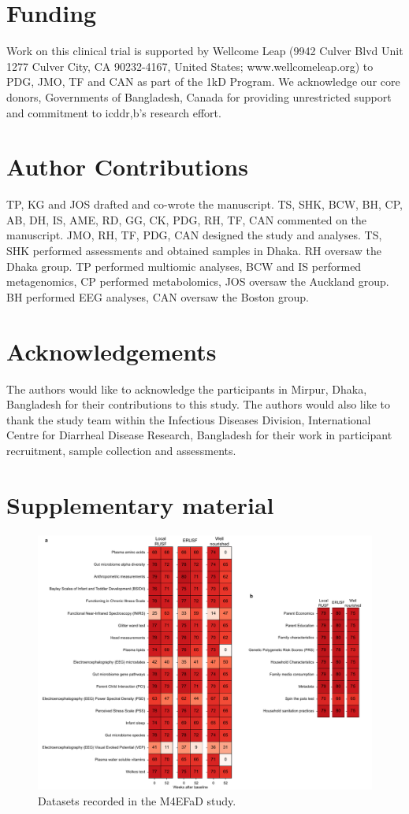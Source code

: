 \documentclass{article}
\begin{document}
\section*{Funding}
Work on this clinical trial is supported by Wellcome Leap (9942 Culver Blvd Unit 1277 Culver City, CA 90232-4167, United States; www.wellcomeleap.org) to PDG, JMO, TF and CAN as part of the 1kD Program.
We acknowledge our core donors, Governments of Bangladesh, Canada for providing unrestricted support and commitment to icddr,b's research effort.

\section*{Author Contributions}
TP, KG and JOS drafted and co-wrote the manuscript.
TS, SHK, BCW, BH, CP, AB, DH, IS, AME, RD, GG, CK, PDG, RH, TF, CAN commented on the manuscript.
JMO, RH, TF, PDG, CAN designed the study and analyses.
TS, SHK performed assessments and obtained samples in Dhaka.
RH oversaw the Dhaka group.
TP performed multiomic analyses, BCW and IS performed metagenomics, CP performed metabolomics, JOS oversaw the Auckland group.
BH performed EEG analyses, CAN oversaw the Boston group.

\section*{Acknowledgements}
The authors would like to acknowledge the participants in Mirpur, Dhaka, Bangladesh for their contributions to this study.
The authors would also like to thank the study team within the Infectious Diseases Division, International Centre for Diarrheal Disease Research, Bangladesh for their work in participant recruitment, sample collection and assessments.



\newpage

\section*{Supplementary material}
\begin{figure}[!htb]
\centering
\includegraphics[scale=0.8]{../../figures/newalldata.pdf}
	\caption[Datasets recoreded in the M4EFaD study]{
		Datasets recorded in the M4EFaD study.
	}
\label{Figure1}
\end{figure}
\end{document}
